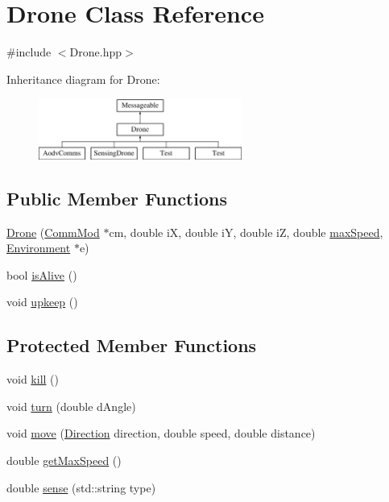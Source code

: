 \hypertarget{class_drone}{}\section{Drone Class Reference}
\label{class_drone}


{\ttfamily \#include $<$Drone.\+hpp$>$}

Inheritance diagram for Drone\+:\begin{figure}[H]
\begin{center}
\leavevmode
\includegraphics[height=2.000000cm]{class_drone}
\end{center}
\end{figure}
\subsection*{Public Member Functions}
\begin{DoxyCompactItemize}
\item 
\hyperlink{class_drone_a671923cbf775d479aa11f469b82503f3}{Drone} (\hyperlink{class_comm_mod}{Comm\+Mod} $\ast$cm, double iX, double iY, double iZ, double \hyperlink{class_drone_a9dcad921c51f4e7455ef79c16261404c}{max\+Speed}, \hyperlink{class_environment}{Environment} $\ast$e)
\item 
bool \hyperlink{class_drone_a5181059ce456e7ccdf3366ee1f8156db}{is\+Alive} ()
\item 
void \hyperlink{class_drone_a4a53691055a0561e5069ea1482ac893b}{upkeep} ()
\end{DoxyCompactItemize}
\subsection*{Protected Member Functions}
\begin{DoxyCompactItemize}
\item 
void \hyperlink{class_drone_a87b644ed6c297252a0930b4a915a553e}{kill} ()
\item 
void \hyperlink{class_drone_a81c5a726112abba3d686e95baccd54be}{turn} (double d\+Angle)
\item 
void \hyperlink{class_drone_ae7ebc3df04a42e9c49389ab2868d102d}{move} (\hyperlink{_drone_8hpp_a224b9163917ac32fc95a60d8c1eec3aa}{Direction} direction, double speed, double distance)
\item 
double \hyperlink{class_drone_a780e43c6486a26eb47a37295ea510269}{get\+Max\+Speed} ()
\item 
double \hyperlink{class_drone_abd485e52d2ac2d6d81038665495bb480}{sense} (std\+::string type)
\end{DoxyCompactItemize}
